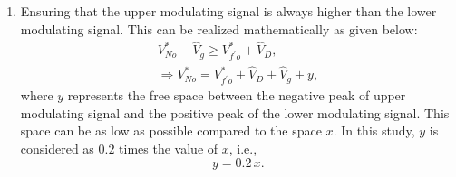 \begin{enumerate}
	\item Ensuring that the upper modulating signal is always higher than the lower modulating signal. This can be realized mathematically as given below:
	\begin{equation}  \label{6.5}
	\begin{aligned}
	V^{*}_{No} - \hat{V}_{g} \geq V^{*}_{f^{\prime}o} + \hat{V}_{D}, \\
	\Rightarrow V^{*}_{No} = V^{*}_{f^{\prime}o} + \hat{V}_{D} + \hat{V}_{g} + y,
	\end{aligned}
	\end{equation}
	where $y$ represents the free space between the negative peak of upper modulating signal and the positive peak of the lower modulating signal. This space can be as low as possible compared to the space $x$. In this study, $y$ is considered as $0.2$ times the value of $x$, i.e.,
	\begin{equation}  \label{6.6}
		y = 0.2 \, x.
	\end{equation} 
\end{enumerate}

